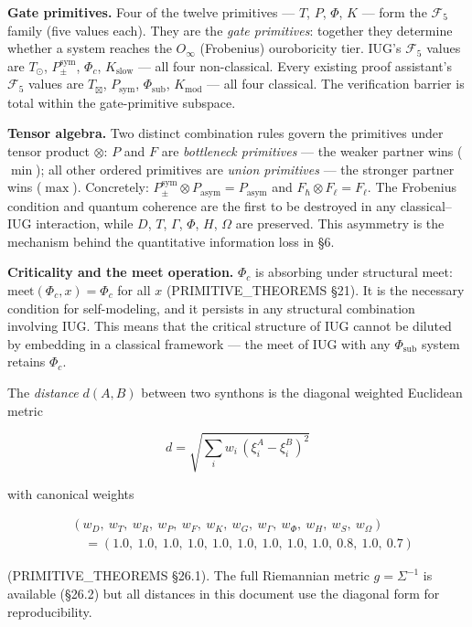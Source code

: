 \documentclass[10pt,a4paper]{article}
\newcommand{\pilcrow}{\S}
\begin{document}
\textbf{Gate primitives.} Four of the twelve primitives --- $T$, $P$, $\Phi$, $K$ --- form the
$\mathcal{F}_5$ family (five values each).
They are the \emph{gate primitives}: together they determine whether a system reaches the
$O_\infty$ (Frobenius) ouroboricity tier.
IUG's $\mathcal{F}_5$ values are $T_\odot$, $P_{\pm}^{\text{sym}}$, $\Phi_c$, $K_\text{slow}$ ---
all four non-classical.
Every existing proof assistant's $\mathcal{F}_5$ values are $T_{\boxtimes}$, $P_\text{sym}$,
$\Phi_\text{sub}$, $K_\text{mod}$ --- all four classical.
The verification barrier is total within the gate-primitive subspace.

\textbf{Tensor algebra.} Two distinct combination rules govern the primitives under tensor product $\otimes$:
$P$ and $F$ are \emph{bottleneck primitives} --- the weaker partner wins ($\min$);
all other ordered primitives are \emph{union primitives} --- the stronger partner wins ($\max$).
Concretely: $P_{\pm}^{\text{sym}} \otimes P_\text{asym} = P_\text{asym}$ and
$F_{\hbar} \otimes F_{\ell} = F_{\ell}$.
The Frobenius condition and quantum coherence are the first to be destroyed in any
classical--IUG interaction, while $D$, $T$, $\Gamma$, $\Phi$, $H$, $\Omega$ are preserved.
This asymmetry is the mechanism behind the quantitative information loss in \S6.

\textbf{Criticality and the meet operation.} $\Phi_c$ is absorbing under structural meet:
$\text{meet}(\Phi_c, x) = \Phi_c$ for all $x$ (PRIMITIVE\_THEOREMS \pilcrow{}21).
It is the necessary condition for self-modeling, and it persists in any structural combination
involving IUG.
This means that the critical structure of IUG cannot be diluted by embedding in a classical
framework --- the meet of IUG with any $\Phi_\text{sub}$ system retains $\Phi_c$.

The \emph{distance} $d(A, B)$ between two synthons is the diagonal weighted Euclidean metric

\[d = \sqrt{\textstyle\sum_i w_i\,(\xi_i^A - \xi_i^B)^2}\]

with canonical weights

\[
\begin{aligned}
& (w_D,\ w_T,\ w_R,\ w_P,\ w_F,\ w_K,\ w_G,\ w_{\Gamma},\ w_{\Phi},\ w_H,\ w_S,\ w_{\Omega}) \\
&\quad = (1.0,\ 1.0,\ 1.0,\ 1.0,\ 1.0,\ 1.0,\ 1.0,\ 1.0,\ 1.0,\ 0.8,\ 1.0,\ 0.7)
\end{aligned}
\]

(PRIMITIVE\_THEOREMS \pilcrow{}26.1). The full Riemannian metric $g = \Sigma^{-1}$ is available
(\pilcrow{}26.2) but all distances in this document use the diagonal form for reproducibility.
\end{document}
